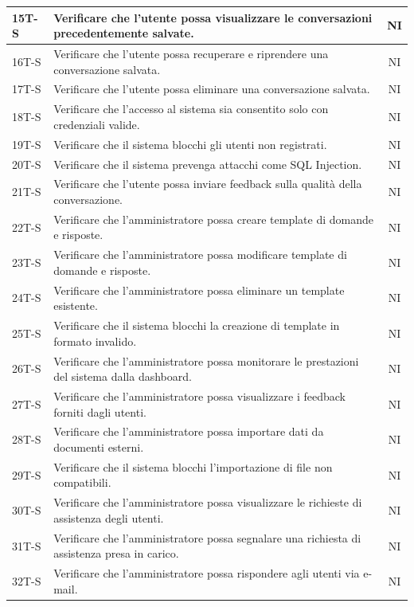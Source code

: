 \documentclass{article}
\begin{document}
\begin{longtable}{|>{\centering\arraybackslash}m{}|>{\raggedright\arraybackslash}m{}|c|}
    \hline
    15T-S & Verificare che l’utente possa visualizzare le conversazioni precedentemente salvate. & NI \\
    \hline
    16T-S & Verificare che l’utente possa recuperare e riprendere una conversazione salvata. & NI \\
    \hline
    17T-S & Verificare che l’utente possa eliminare una conversazione salvata. & NI \\
    \hline
    18T-S & Verificare che l’accesso al sistema sia consentito solo con credenziali valide. & NI \\
    \hline
    19T-S & Verificare che il sistema blocchi gli utenti non registrati. & NI \\
    \hline
    20T-S & Verificare che il sistema prevenga attacchi come SQL Injection. & NI \\
    \hline
    21T-S & Verificare che l’utente possa inviare feedback sulla qualità della conversazione. & NI \\
    \hline
    22T-S & Verificare che l’amministratore possa creare template di domande e risposte. & NI \\
    \hline
    23T-S & Verificare che l’amministratore possa modificare template di domande e risposte. & NI \\
    \hline
    24T-S & Verificare che l’amministratore possa eliminare un template esistente. & NI \\
    \hline
    25T-S & Verificare che il sistema blocchi la creazione di template in formato invalido. & NI \\
    \hline
    26T-S & Verificare che l’amministratore possa monitorare le prestazioni del sistema dalla dashboard. & NI \\
    \hline
    27T-S & Verificare che l’amministratore possa visualizzare i feedback forniti dagli utenti. & NI \\
    \hline
    28T-S & Verificare che l’amministratore possa importare dati da documenti esterni. & NI \\
    \hline
    29T-S & Verificare che il sistema blocchi l’importazione di file non compatibili. & NI \\
    \hline
    30T-S & Verificare che l’amministratore possa visualizzare le richieste di assistenza degli utenti. & NI \\
    \hline
    31T-S & Verificare che l’amministratore possa segnalare una richiesta di assistenza presa in carico. & NI \\
    \hline
    32T-S & Verificare che l’amministratore possa rispondere agli utenti via e-mail. & NI \\

\end{longtable}
\end{document}
